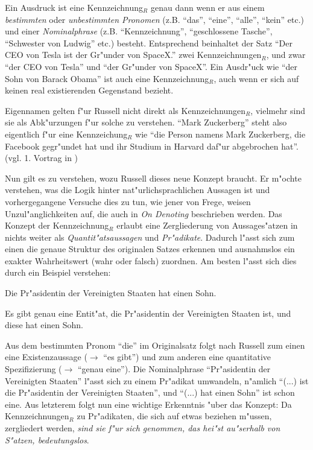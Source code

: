 \documentclass[a4paper, emulatestandardclasses, 12pt]{scrartcl}
\begin{document}
\begin{onehalfspace}
Ein Ausdruck ist eine Kennzeichnung$_{R}$ genau dann wenn er aus einem \emph{bestimmten} oder \emph{unbestimmten Pronomen} (z.B. "`das"', "`eine"', "`alle"', "`kein"' etc.) und einer \emph{Nominalphrase} (z.B. "`Kennzeichnung"', "`geschlossene Tasche"', "`Schwester von Ludwig"' etc.) besteht. Entsprechend beinhaltet der Satz "`Der CEO von Tesla ist der Gr"under von SpaceX."' zwei Kennzeichnungen$_{R}$, und zwar "`der CEO von Tesla"' und "`der Gr"under von SpaceX"'. Ein Ausdr"uck wie "`der Sohn von Barack Obama"' ist auch eine Kennzeichnung$_{R}$, auch wenn er sich auf keinen real existierenden Gegenstand bezieht. 

Eigennamen gelten f"ur Russell nicht direkt als Kennzeichnungen$_{R}$, vielmehr sind sie als Abk"urzungen f"ur solche zu verstehen. "`Mark Zuckerberg"' steht also eigentlich f"ur eine Kennzeichung$_{R}$ wie "`die Person namens Mark Zuckerberg, die Facebook gegr"undet hat und ihr Studium in Harvard daf"ur abgebrochen hat"'. (vgl. 1. Vortrag in \cite{kripke1972naming})

Nun gilt es zu verstehen, wozu Russell dieses neue Konzept braucht. Er m"ochte verstehen, was die Logik hinter nat"urlichsprachlichen Aussagen ist und vorhergegangene Versuche dies zu tun, wie jener von Frege, weisen Unzul"anglichkeiten auf, die auch in \emph{On Denoting} beschrieben werden. Das Konzept der Kennzeichnung$_{R}$ erlaubt eine Zergliederung von Aussages"atzen in nichts weiter als \emph{Quantit"atsaussagen} und \emph{Pr"adikate}. Dadurch l"asst sich zum einen die genaue Struktur des originalen Satzes erkennen und ausnahmslos ein exakter Wahrheitswert (wahr oder falsch) zuordnen. Am besten l"asst sich dies durch ein Beispiel verstehen:\newpage

\begin{description}[leftmargin=!,labelwidth=\widthof{\bfseries Zergliederung}]
    \item[Originalsatz] Die Pr"asidentin der Vereinigten Staaten hat einen Sohn.
    \item[Zergliederung] Es gibt genau eine Entit"at, die Pr"asidentin der Vereinigten Staaten ist, und diese hat einen Sohn. 
\end{description}

Aus dem bestimmten Pronom "`die"' im Originalsatz folgt nach Russell zum einen eine Existenzaussage ($\rightarrow$ "`es gibt"') und zum anderen eine quantitative Spezifizierung ($\rightarrow$ "`genau eine"'). Die Nominalphrase "`Pr"asidentin der Vereinigten Staaten"' l"asst sich zu einem Pr"adikat umwandeln, n"amlich "`(...) ist die Pr"asidentin der Vereinigten Staaten"', und "`(...) hat einen Sohn"' ist schon eine. Aus letzterem folgt nun eine wichtige Erkenntnis "uber das Konzept: Da Kennzeichnungen$_{R}$  zu Pr"adikaten, die sich auf etwas beziehen m"ussen, zergliedert werden, \emph{sind sie f"ur sich genommen, das hei"st au"serhalb von S"atzen, bedeutungslos}. 


\end{onehalfspace}
\end{document}

